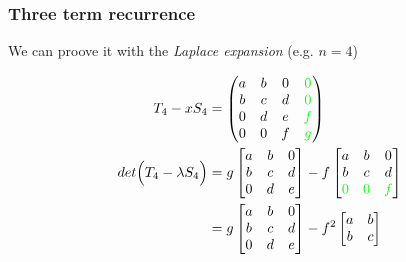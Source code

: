 \documentclass{beamer}
\theoremstyle{definition} \newtheorem{de}{Def}
\theoremstyle{remark} \newtheorem{os}[de]{Remark}
\theoremstyle{plain} \newtheorem{te}[de]{Teo}
\theoremstyle{plain} \newtheorem{co}[de]{Cor}
\theoremstyle{plain} \newtheorem{pr}[de]{Prop}
\theoremstyle{plain} \newtheorem{lem}[de]{Lemm}
\theoremstyle{remark} \newtheorem{rem}[de]{Remark}
\begin{document}
\begin{frame}
  \frametitle{Three term recurrence}

  We can proove it with the \emph{Laplace expansion} (e.g. $n=4$)

  \begin{align*}
    T_4 - x S_4  &= \begin{pmatrix} 
      a & b & 0 & \textcolor{green}{0}\\
      b & c & d & \textcolor{green}{0}\\
      0 & d & e & \textcolor{green}{f}\\
      0 & 0 & f & \textcolor{green}{g}
    \end{pmatrix} \\
    det \Big( T_4 - \lambda S_4 \Big) &= g \begin{bmatrix}
      a & b & 0\\
      b & c & d\\
      0 & d & e
    \end{bmatrix} -f \begin{bmatrix}
      a & b & 0\\
      b & c & d\\
      \textcolor{green}{0} & \textcolor{green}{0} & \textcolor{green}{f}
    \end{bmatrix}\\
    &= g \begin{bmatrix} 
      a & b & 0\\
      b & c & d\\
      0 & d & e
    \end{bmatrix} - f^2 \begin{bmatrix} a & b \\ b & c \end{bmatrix}
  \end{align*}

\end{frame}
\end{document}
